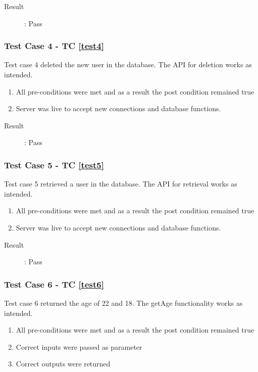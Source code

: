 \documentclass{article}
\begin{document}
\begin{description}
	\item [Result]: Pass 
\end{description}


\subsubsection{Test Case 4 - TC \ref{test4}}
Test case 4 deleted the new user in the database.
The API for deletion works as intended.
\begin{enumerate}
	\item All pre-conditions were met and as a result the post condition remained true
	\item Server was live to accept new connections and database functions.
\end{enumerate}

\begin{description}
	\item [Result]: Pass 
\end{description}


\subsubsection{Test Case 5 - TC \ref{test5}}
Test case 5 retrieved a user in the database.
The API for retrieval works as intended.
\begin{enumerate}
	\item All pre-conditions were met and as a result the post condition remained true
	\item Server was live to accept new connections and database functions.
\end{enumerate}

\begin{description}
	\item [Result]: Pass 
\end{description}


\subsubsection{Test Case 6 - TC \ref{test6}}
Test case 6 returned the age of 22 and 18. 
The getAge functionality works as intended.
\begin{enumerate}
	\item All pre-conditions were met and as a result the post condition remained true
	\item Correct inputs were passed as parameter 
	\item Correct outputs were returned
\end{enumerate}
\end{document}
